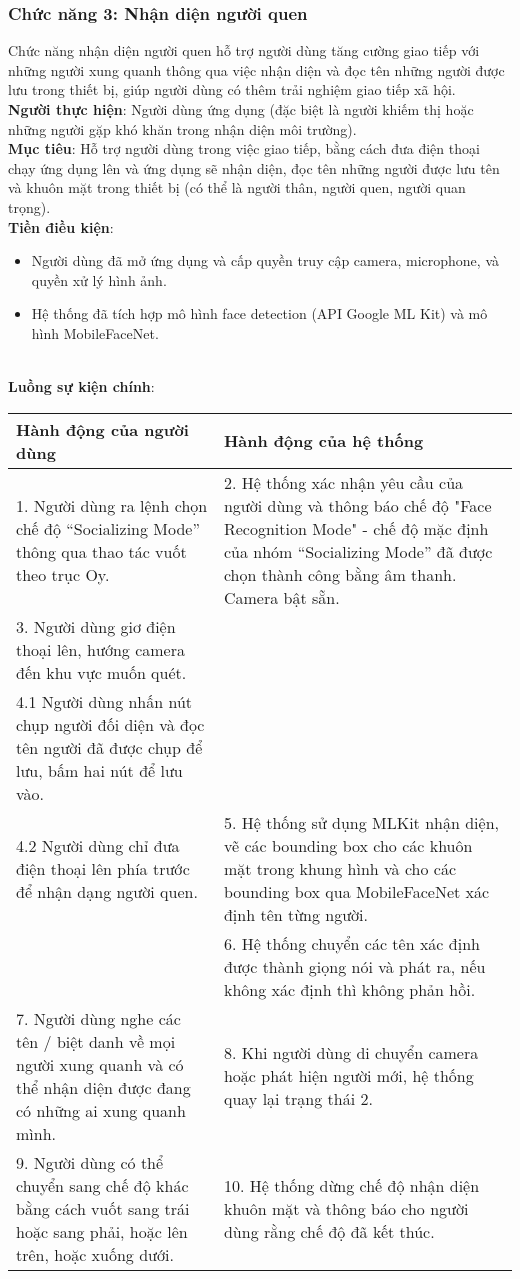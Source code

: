\documentclass[a4paper,12pt]{article}
\begin{document}
\subsubsection{Chức năng 3: Nhận diện người quen}
Chức năng nhận diện người quen hỗ trợ người dùng tăng cường giao tiếp với những người xung quanh thông qua việc nhận diện và đọc tên những người được lưu trong thiết bị, giúp người dùng có thêm trải nghiệm giao tiếp xã hội.
\\
\textbf{Người thực hiện}: Người dùng ứng dụng (đặc biệt là người khiếm thị hoặc những người gặp khó khăn trong nhận diện môi trường).
\\
\textbf{Mục tiêu}: Hỗ trợ người dùng trong việc giao tiếp, bằng cách đưa điện thoại chạy ứng dụng lên và ứng dụng sẽ nhận diện, đọc tên những người được lưu tên và khuôn mặt trong thiết bị (có thể là người thân, người quen, người quan trọng).
\\
\textbf{Tiền điều kiện}:
\begin{itemize}
    \item Người dùng đã mở ứng dụng và cấp quyền truy cập camera, microphone, và quyền xử lý hình ảnh.
    \item Hệ thống đã tích hợp mô hình face detection (API Google ML Kit) và mô hình MobileFaceNet.
\end{itemize}
\\
\textbf{Luồng sự kiện chính}:
\\
\begin{longtable}{|p{6cm}|p{8cm}|}
\hline
\textbf{Hành động của người dùng} & \textbf{Hành động của hệ thống} \\
\hline
1. Người dùng ra lệnh chọn chế độ “Socializing Mode” thông qua thao tác vuốt theo trục Oy. & 
2. Hệ thống xác nhận yêu cầu của người dùng và thông báo chế độ "Face Recognition Mode" - chế độ mặc định của nhóm “Socializing Mode” đã được chọn thành công bằng âm thanh. Camera bật sẵn. \\
\hline
3. Người dùng giơ điện thoại lên, hướng camera đến khu vực muốn quét. &\\
\hline
4.1 Người dùng nhấn nút chụp người đối diện và đọc tên người đã được chụp để lưu, bấm hai nút để lưu vào. & \\
\hline
4.2 Người dùng chỉ đưa điện thoại lên phía trước để nhận dạng người quen. & 
5. Hệ thống sử dụng MLKit nhận diện, vẽ các bounding box cho các khuôn mặt trong khung hình và cho các bounding box qua MobileFaceNet xác định tên từng người. \\
\hline
& 6. Hệ thống chuyển các tên xác định được thành giọng nói và phát ra, nếu không xác định thì không phản hồi.\\
\hline
7. Người dùng nghe các tên / biệt danh về mọi người xung quanh và có thể nhận diện được đang có những ai xung quanh mình. &
8. Khi người dùng di chuyển camera hoặc phát hiện người mới, hệ thống quay lại trạng thái 2. \\
\hline
9. Người dùng có thể chuyển sang chế độ khác bằng cách vuốt sang trái hoặc sang phải, hoặc lên trên, hoặc xuống dưới. &
10. Hệ thống dừng chế độ nhận diện khuôn mặt và thông báo cho người dùng rằng chế độ đã kết thúc.
\\
\hline
\end{longtable}
\end{document}
